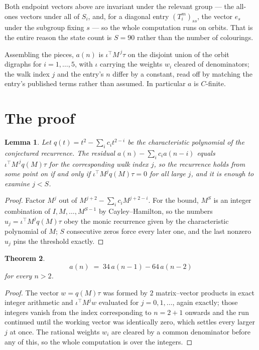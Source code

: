 \documentclass[11pt,a4paper]{article}
\theoremstyle{plain}
\newtheorem{theorem}{Theorem}
\newtheorem{lemma}[theorem]{Lemma}
\theoremstyle{definition}
\begin{document}
Both endpoint vectors above are invariant under the relevant group --- the all-ones vectors
under all of $S_i$, and, for a diagonal entry $(T_i^m)_{ss}$, the vector $e_s$ under the
subgroup fixing $s$ --- so the whole computation runs on orbits. That is the entire reason the
state count is $S=90$ rather than the number of colourings.

Assembling the pieces, $a(n)$ is $\iota^{\!\top}M^{\,j}\tau$ on the disjoint union of the
orbit digraphs for $i=1,\dots,5$, with $\iota$ carrying the weights $w_i$ cleared of
denominators; the walk index $j$ and the entry's $n$ differ by a constant, read off by
matching the entry's published terms rather than assumed. In particular $a$ is $C$-finite.

\section{The proof}

\begin{lemma}\label{lem:crit}
Let $q(t)=t^{2}-\sum_i c_it^{2-i}$ be the characteristic polynomial of the
conjectured recurrence. The residual $a(n)-\sum_ic_ia(n-i)$ equals
$\iota^{\!\top}M^{\,j}q(M)\tau$ for the corresponding walk index $j$, so the recurrence
holds from some point on if and only if $\iota^{\!\top}M^{j}q(M)\tau=0$ for all large $j$,
and it is enough to examine $j<S$.
\end{lemma}

\begin{proof}
Factor $M^{j}$ out of $M^{j+2}-\sum_ic_iM^{j+2-i}$. For the bound, $M^{S}$
is an integer combination of $I,M,\dots,M^{S-1}$ by Cayley--Hamilton, so the numbers
$u_j=\iota^{\!\top}M^{j}q(M)\tau$ obey the monic recurrence given by the characteristic
polynomial of $M$; $S$ consecutive zeros force every later one, and the last nonzero $u_j$
pins the threshold exactly.
\end{proof}

\begin{theorem}
\[
a(n)\;=\;34\,a(n-1) - 64\,a(n-2)
\]
for every $n>2$.
\end{theorem}

\begin{proof}
The vector $w=q(M)\tau$ was formed by $2$ matrix--vector products in exact integer
arithmetic and $\iota^{\!\top}M^{j}w$ evaluated for $j=0,1,\dots$, again exactly; those
integers vanish from the index corresponding to $n=2+1$ onwards and the run continued
until the working vector was identically zero, which settles every larger $j$ at once. The
rational weights $w_i$ are cleared by a common denominator before any of this, so the whole
computation is over the integers.
\end{proof}
\end{document}
